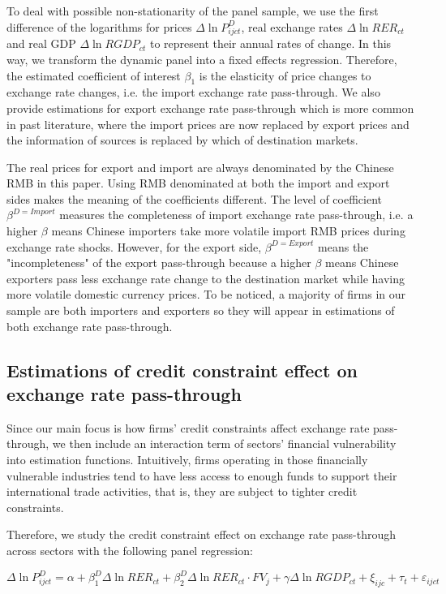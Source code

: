 To deal with possible non-stationarity of the panel sample, we use the first difference of the logarithms for prices $\Delta \ln P^{D}_{i j c t}$, real exchange rates $\Delta \ln R E R_{c t}$ and real GDP $\Delta \ln R G D P_{c t}$ to represent their annual rates of change. In this way, we transform the dynamic panel into a fixed effects regression. Therefore, the estimated coefficient of interest $\beta_1$ is the elasticity of price changes to exchange rate changes, i.e. the import exchange rate pass-through. We also provide estimations for export exchange rate pass-through which is more common in past literature, where the import prices are now replaced by export prices and the information of sources is replaced by which of destination markets. 

The real prices for export and import are always denominated by the Chinese RMB in this paper. Using RMB denominated at both the import and export sides makes the meaning of the coefficients different. The level of coefficient $\beta^{D=Import}$ measures the completeness of import exchange rate pass-through, i.e. a higher $\beta$ means Chinese importers take more volatile import RMB prices during exchange rate shocks. However, for the export side,  $\beta^{D=Export}$ means the "incompleteness" of the export pass-through because a higher $\beta$ means Chinese exporters pass less exchange rate change to the destination market while having more volatile domestic currency prices. To be noticed, a majority of firms in our sample are both importers and exporters so they will appear in estimations of both exchange rate pass-through.

\subsection{Estimations of credit constraint effect on exchange rate pass-through}\label{seq-4.1.2}

Since our main focus is how firms' credit constraints affect exchange rate pass-through, we then include an interaction term of sectors’ financial vulnerability into estimation functions. Intuitively, firms operating in those financially vulnerable industries tend to have less access to enough funds to support their international trade activities, that is, they are subject to tighter credit constraints.

Therefore, we study the credit constraint effect on exchange rate pass-through across sectors with the following panel regression:

\begin{equation}
	\Delta \ln P^{D}_{ijct}=\alpha+\beta^D_{1} \Delta \ln RER_{ct}+\beta^D_{2} \Delta \ln RER_{ct} \cdot FV_{j}+\gamma \Delta \ln RGDP_{ct}+\xi_{ijc}+\tau_{t} +\varepsilon_{ijct}
	\label{eq4.2}
\end{equation}

